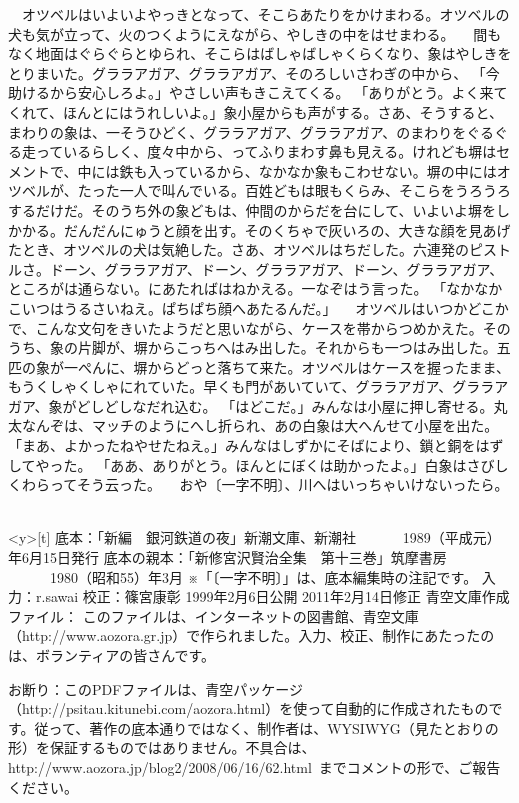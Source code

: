 \documentclass[a5paper, twocolumn]{tbook}
\renewenvironment{teihon}{\comment}{\endcomment}
\begin{document}
　オツベルはいよいよやっきとなって、そこらあたりをかけまわる。オツベルの犬も気が立って、火のつくようにえながら、やしきの中をはせまわる。
　間もなく地面はぐらぐらとゆられ、そこらはばしゃばしゃくらくなり、象はやしきをとりまいた。グララアガア、グララアガア、そのろしいさわぎの中から、
「今助けるから安心しろよ。」やさしい声もきこえてくる。
「ありがとう。よく来てくれて、ほんとにはうれしいよ。」象小屋からも声がする。さあ、そうすると、まわりの象は、一そうひどく、グララアガア、グララアガア、のまわりをぐるぐる走っているらしく、度々中から、ってふりまわす鼻も見える。けれども塀はセメントで、中には鉄も入っているから、なかなか象もこわせない。塀の中にはオツベルが、たった一人で叫んでいる。百姓どもは眼もくらみ、そこらをうろうろするだけだ。そのうち外の象どもは、仲間のからだを台にして、いよいよ塀をしかかる。だんだんにゅうと顔を出す。そのくちゃで灰いろの、大きな顔を見あげたとき、オツベルの犬は気絶した。さあ、オツベルはちだした。六連発のピストルさ。ドーン、グララアガア、ドーン、グララアガア、ドーン、グララアガア、ところがは通らない。にあたればはねかえる。一なぞはう言った。
「なかなかこいつはうるさいねえ。ぱちぱち顔へあたるんだ。」
　オツベルはいつかどこかで、こんな文句をきいたようだと思いながら、ケースを帯からつめかえた。そのうち、象の片脚が、塀からこっちへはみ出した。それからも一つはみ出した。五匹の象が一ぺんに、塀からどっと落ちて来た。オツベルはケースを握ったまま、もうくしゃくしゃにれていた。早くも門があいていて、グララアガア、グララアガア、象がどしどしなだれ込む。
「はどこだ。」みんなは小屋に押し寄せる。丸太なんぞは、マッチのようにへし折られ、あの白象は大へんせて小屋を出た。
「まあ、よかったねやせたねえ。」みんなはしずかにそばにより、鎖と銅をはずしてやった。
「ああ、ありがとう。ほんとにぼくは助かったよ。」白象はさびしくわらってそう云った。
　おや〔一字不明〕、川へはいっちゃいけないったら。
　
　
　
\theendnotes
\begin{teihon}
\clearpage\thispagestyle{empty}
\begin{minipage}<y>[t]{\textheight}
\vspace{0.5\baselineskip}
\scriptsize
底本：「新編　銀河鉄道の夜」新潮文庫、新潮社
　　　1989（平成元）年6月15日発行
底本の親本：「新修宮沢賢治全集　第十三巻」筑摩書房
　　　1980（昭和55）年3月
※「〔一字不明〕」は、底本編集時の注記です。
入力：r.sawai
校正：篠宮康彰
1999年2月6日公開
2011年2月14日修正
青空文庫作成ファイル：
このファイルは、インターネットの図書館、青空文庫（http://www.aozora.gr.jp）で作られました。入力、校正、制作にあたったのは、ボランティアの皆さんです。

\vspace{0.5\baselineskip}
お断り：このPDFファイルは、青空パッケージ（http://psitau.kitunebi.com/aozora.html）を使って自動的に作成されたものです。従って、著作の底本通りではなく、制作者は、WYSIWYG（見たとおりの形）を保証するものではありません。不具合は、http://www.aozora.jp/blog2/2008/06/16/62.html\ までコメントの形で、ご報告ください。


\end{minipage}
\end{teihon}
\end{document}
